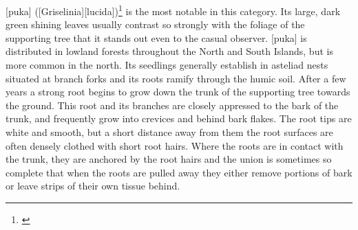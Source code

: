 [puka] ([Griselinia][lucida])\footnote{\cite{dawson1966vegetative}} is the most notable in this category.
Its large, dark green shining leaves usually contrast so strongly with the foliage of the supporting tree that it stands out even to the casual observer.
[puka] is distributed in lowland forests throughout the North and South Islands, but is more common in the north.
Its seedlings generally establish in asteliad nests situated at branch forks and its roots ramify through the humic soil.
After a few years a strong root begins to grow down the trunk of the supporting tree towards the ground.
This root and its branches are closely appressed to the bark of the trunk, and frequently grow into crevices and behind bark flakes.
The root tips are white and smooth, but a short distance away from them the root surfaces are often densely clothed with short root hairs.
Where the roots are in contact with the trunk, they are anchored by the root hairs and the union is sometimes so complete that when the roots are pulled away they either remove portions of bark or leave strips of their own tissue behind.


